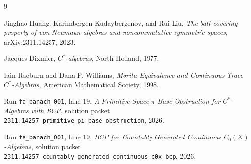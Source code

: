 \documentclass[11pt]{article}
\begin{document}
\begin{thebibliography}{9}

Jinghao Huang, Karimbergen Kudaybergenov, and Rui Liu,
\emph{The ball-covering property of von Neumann algebras and noncommutative
symmetric spaces},
arXiv:2311.14257, 2023.

Jacques Dixmier,
\emph{\(C^*\)-algebras},
North-Holland, 1977.

Iain Raeburn and Dana P. Williams,
\emph{Morita Equivalence and Continuous-Trace \(C^*\)-Algebras},
American Mathematical Society, 1998.

Run \texttt{fa\_banach\_001}, lane 19,
\emph{A Primitive-Space \(\pi\)-Base Obstruction for \(C^*\)-Algebras with
BCP},
solution packet
\texttt{2311.14257\_primitive\_pi\_base\_obstruction}, 2026.

Run \texttt{fa\_banach\_001}, lane 19,
\emph{BCP for Countably Generated Continuous \(C_0(X)\)-Algebras},
solution packet
\texttt{2311.14257\_countably\_generated\_continuous\_c0x\_bcp}, 2026.

\end{thebibliography}
\end{document}
